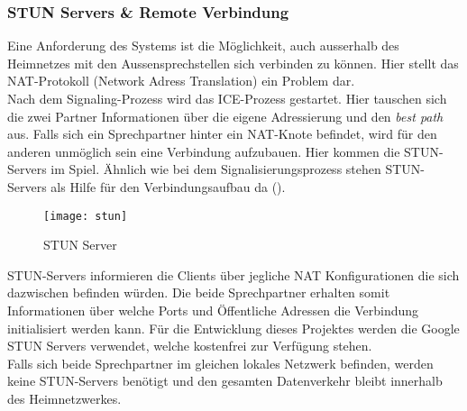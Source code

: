 \subsubsection{STUN Servers \& Remote Verbindung}
\label{test}
Eine Anforderung des Systems ist die Möglichkeit, auch ausserhalb des Heimnetzes mit den Aussensprechstellen sich verbinden zu können. Hier stellt das NAT-Protokoll (Network Adress Translation) ein Problem dar.
\\
Nach dem Signaling-Prozess wird das ICE-Prozess gestartet. Hier tauschen sich die zwei Partner Informationen über die eigene Adressierung und den \textit{best path} aus. Falls sich ein Sprechpartner hinter ein NAT-Knote befindet, wird für den anderen unmöglich sein eine Verbindung aufzubauen. Hier kommen die STUN-Servers im Spiel. Ähnlich wie bei dem Signalisierungsprozess stehen STUN-Servers als Hilfe für den Verbindungsaufbau da ().
\begin{figure}[htb!]
	\begin{center}
		\texttt{[image: stun]}
		\caption[STUN Server]{STUN Server}
		\label{fig:stun}
	\end{center}
\end{figure}
 STUN-Servers informieren die Clients über jegliche NAT Konfigurationen die sich dazwischen befinden würden. Die beide Sprechpartner erhalten somit Informationen über welche Ports und Öffentliche Adressen die Verbindung initialisiert werden kann. Für die Entwicklung dieses Projektes werden die Google STUN Servers verwendet, welche kostenfrei zur Verfügung stehen.
\\
Falls sich beide Sprechpartner im gleichen lokales Netzwerk befinden, werden keine STUN-Servers benötigt und den gesamten Datenverkehr bleibt innerhalb des Heimnetzwerkes.

\newpage